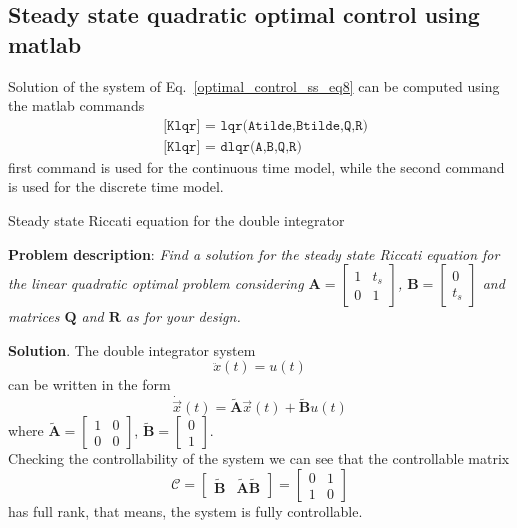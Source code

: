 \documentclass[12pt,a4paper,oneside]{book}
\begin{document}
\begin{onehalfspace}
\subsection{Steady state quadratic optimal control using matlab}
Solution of the system of Eq.~\eqref{optimal_control_ss_eq8} can be computed using the matlab commands
\begin{equation}
	\begin{aligned}
		&\texttt{[Klqr] = lqr(Atilde,Btilde,Q,R)} \\[6pt]
		&\texttt{[Klqr] = dlqr(A,B,Q,R)}
	\end{aligned}
\end{equation}
first command is used for the continuous time model, while the second command is used for the discrete time model.
\begin{example}{Steady state Riccati equation for the double integrator}
	
\textbf{Problem description}:
\textit{Find a solution for the steady state Riccati equation for the linear quadratic optimal problem considering 
	$\mathbf{A}=\begin{bmatrix}1&t_s\\0&1\end{bmatrix}$, 
	$\mathbf{B}=\begin{bmatrix}0\\t_s\end{bmatrix}$ and matrices $\mathbf{Q}$ 
	and $\mathbf{R}$ as for your design.}
\vspace{10mm}

\noindent\textbf{Solution}.
The double integrator system 
\begin{equation}\label{example_riccati_eq1}
	\ddot{x}(t)=u(t)
\end{equation}
can be written in the form 
\begin{equation}\label{example_riccati_eq2}
	\dot{\vec{x}}(t)=\tilde{\mathbf{A}}\vec{x}(t)+\tilde{\mathbf{B}}u(t)
\end{equation}
where $\tilde{\mathbf{A}}=\begin{bmatrix}1&0\\0&0\end{bmatrix}$, 
$\tilde{\mathbf{B}}=\begin{bmatrix}0\\1\end{bmatrix}$. \\

Checking the controllability of the system we can see that the controllable matrix 
\begin{equation}
	\mathcal{C}=\begin{bmatrix}
		\tilde{\mathbf{B}} & \tilde{\mathbf{A}}\tilde{\mathbf{B}}
	\end{bmatrix} = \begin{bmatrix} 0&1 \\ 1&0 \end{bmatrix}
\end{equation}
has full rank, that means, the system is fully controllable.


\end{example}
\end{onehalfspace}
\end{document}
